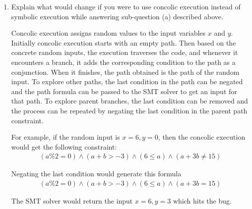 \documentclass[12pt,a4paper]{article}
\begin{document}
\begin{enumerate}
\begin{enumerate}
\begin{enumerate}
\end{enumerate}


\color{black}

\item Explain what would change if you were to use concolic execution instead of symbolic execution
while answering sub-question (a) described above.

\color{blue}
Concolic execution assigns random values to the input variables $x$ and $y$. Initially concolic execution starts with an empty path. Then based on the concrete random inputs, the execution traverses the code, and whenever it encounters a branch, it adds the corresponding condition to the path as a conjunction. When it finishes, the path obtained is the path of the random input. To explore other paths, the last condition in the path can be negated and the path formula can be passed to the SMT solver to get an input for that path. 
To explore parent branches, the last condition can be removed and the process can be repeated by negating the last condition in the parent path constraint. 

For example, if the random input is $x = 6, y = 0$, then the concolic execution would get the following constraint:
\begin{align*}
(a\%2 = 0) \wedge (a + b > -3) \wedge (6 \leq a) \wedge (a + 3b \neq 15)
\end{align*}

Negating the last condition would generate this formula
\begin{align*}
(a\%2 = 0) \wedge (a + b > -3) \wedge (6 \leq a) \wedge (a + 3b = 15)
\end{align*}

The SMT solver would return the input $x = 6, y = 3$ which hits the bug. 

\color{black}

\end{enumerate}
\end{enumerate}
\end{document}

